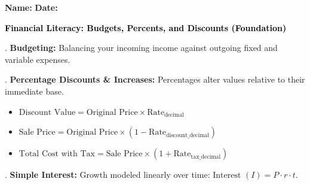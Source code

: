 \documentclass[12pt, letterpaper, fleqn]{article}
\begin{document}
\textbf{Name:} \underline{\hspace{5cm}}
\hfill
\textbf{Date:} \underline{\hspace{3cm}}\\

\begin{tcolorbox}[colback=black!10]
    \large\textcolor{black}{\textbf{Financial Literacy: Budgets, Percents, and Discounts (Foundation)}}
\end{tcolorbox}

\vspace{1mm}

. \textbf{Budgeting:} Balancing your incoming income against outgoing fixed and variable expenses.\\
\vspace{0.5cm}

. \textbf{Percentage Discounts \& Increases:} Percentages alter values relative to their immediate base.
   \begin{itemize}[noitemsep, leftmargin=0.5cm]
       \item $\text{Discount Value} = \text{Original Price} \times \text{Rate}_{\text{decimal}}$
       \item $\text{Sale Price} = \text{Original Price} \times (1 - \text{Rate}_{\text{discount\_decimal}})$
       \item $\text{Total Cost with Tax} = \text{Sale Price} \times (1 + \text{Rate}_{\text{tax\_decimal}})$
   \end{itemize}
\vspace{0.5cm}

. \textbf{Simple Interest:} Growth modeled linearly over time: $\text{Interest } (I) = P \cdot r \cdot t$.
\end{document}
